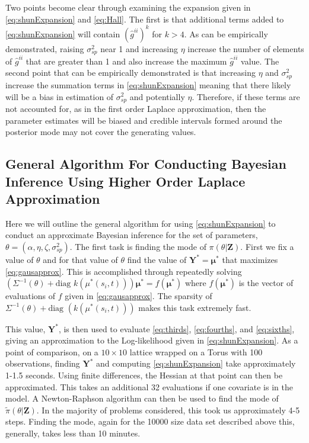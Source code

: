 \documentclass[11pt]{isuthesis}
\begin{document}
	Two points become clear through examining the expansion given in \eqref{eq:shunExpansion} and \eqref{eq:Hall}.  The first is that additional terms added to \eqref{eq:shunExpansion} will contain $(\hat{g}^{ii})^k$ for $k>4$.  As can be empirically demonstrated, raising $\sigma^2_{sp}$ near 1 and increasing $\eta$ increase the number of elements of $\hat{g}^{ii}$ that are greater than 1 and also increase the maximum $\hat{g}^{ii}$ value.  The second point that can be empirically demonstrated is that increasing $\eta$ and $\sigma_{sp}^2$ increase the summation terms in \eqref{eq:shunExpansion} meaning that there likely will be a bias in estimation of $\sigma_{sp}^2$ and potentially $\eta$.  Therefore, if these terms are not accounted for, as in the first order Laplace approximation, then the parameter estimates will be biased and credible intervals formed around the posterior mode may not cover the generating values.
	
	\subsection{General Algorithm For Conducting Bayesian Inference Using Higher Order Laplace Approximation}
	
	Here we will outline the general algorithm for using \eqref{eq:shunExpansion} to conduct an approximate Bayesian inference for the set of parameters, $\theta=\left(\alpha,\eta,\zeta,\sigma_{sp}^2\right)$.  The first task is finding the mode of $\pi(\theta|\boldsymbol{Z})$.  First we fix a value of $\theta$ and for that value of $\theta$ find the value of $\boldsymbol{Y}^*=\boldsymbol{\mu}^*$ that maximizes \eqref{eq:gausapprox}.  This is accomplished through repeatedly solving $\left(\Sigma^{-1}(\theta)+\text{diag }k(\mu^*(s_i,t))\right)\boldsymbol{\mu}^*=f(\boldsymbol{\mu}^*)$ where $f(\boldsymbol{\mu^*})$ is the vector of evaluations of $f$ given in \eqref{eq:gausapprox}.  The sparsity of $\Sigma^{-1}(\theta)+\text{diag }(k(\mu^*(s_i,t)))$ makes this task extremely fast.
	
	This value, $\boldsymbol{Y}^*$, is then used to evaluate \eqref{eq:thirds}, \eqref{eq:fourths}, and \eqref{eq:sixths}, giving an approximation to the Log-likelihood given in \eqref{eq:shunExpansion}.  As a point of comparison, on a $10 \times 10$ lattice wrapped on a Torus with 100 observations, finding $\boldsymbol{Y}^*$ and computing \eqref{eq:shunExpansion} take approximately 1-1.5 seconds.  Using finite differences, the Hessian at that point can then be approximated.  This takes an additional 32 evaluations if one covariate is in the model.  A Newton-Raphson algorithm can then be used to find the mode of $\tilde{\pi}(\theta|\boldsymbol{Z})$.  In the majority of problems considered, this took us approximately 4-5 steps.  Finding the mode, again for the 10000 size data set described above this, generally, takes less than 10 minutes.
	
\end{document}
